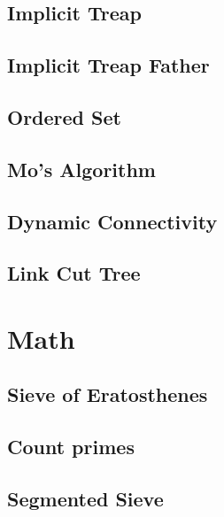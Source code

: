 \subsection{Implicit Treap}
\raggedbottom
\hrulefill
\subsection{Implicit Treap Father}
\raggedbottom
\hrulefill
\subsection{Ordered Set}
\raggedbottom
\hrulefill
\subsection{Mo's Algorithm}
\raggedbottom
\hrulefill
\subsection{Dynamic Connectivity}
\raggedbottom
\hrulefill
\subsection{Link Cut Tree}
\raggedbottom
\hrulefill

\section{Math}
\subsection{Sieve of Eratosthenes}
\raggedbottom
\hrulefill
\subsection{Count primes}
\raggedbottom
\hrulefill
\subsection{Segmented Sieve}
\raggedbottom
\hrulefill
